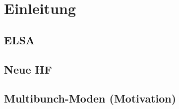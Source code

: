\chapter{Einleitung}
\label{sec:einleitung}

\section{ELSA}

\section{Neue HF}
\cite{schedler}

\section{Multibunch-Moden (Motivation)}
